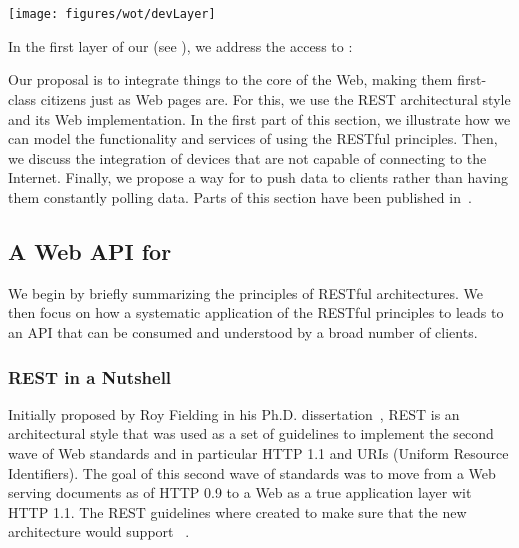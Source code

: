 \section{\devLayer{}}\label{deviceLayer}
\begin{center}
\texttt{[image: figures/wot/devLayer]}
\end{center}
In the first layer of our \WoTA{} (see ), we address the access to \sts{}: 

Our proposal is to integrate things to the core of the Web, making them first-class citizens just as Web pages are. For this, we use the REST architectural style and its Web implementation. In the first part of this section, we illustrate how we can model the functionality and services of \sts{} using the RESTful principles. Then, we discuss the integration of devices that are not capable of connecting to the Internet. Finally, we propose a way for \sts{} to push data to clients rather than having them constantly polling data. Parts of this section have been published in~\cite{Guinard2011b,Guinard2010-WoT,Guinard2009-INSS,Guinard2009}.

\subsection{A Web API for \stsBig{}}\label{APIforSmartThings}
We begin by briefly summarizing the principles of RESTful architectures. We then focus on how a systematic application of the RESTful principles to \sts{} leads to an API that can be consumed and understood by a broad number of clients.
  
\subsubsection{REST in a Nutshell}\label{rest}
Initially proposed by Roy Fielding in his Ph.D. dissertation~\cite{Fielding2000}, REST is an architectural style that was used as a set of guidelines to implement the second wave of Web standards and in particular HTTP 1.1 and URIs (Uniform Resource Identifiers). The goal of this second wave of standards was to move from a Web serving documents as of HTTP 0.9 to a Web as a true application layer wit HTTP 1.1. The REST guidelines where created to make sure that the new architecture would support ~\cite{Fielding2000}.

